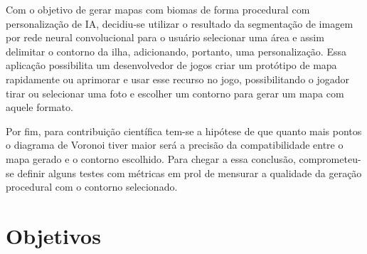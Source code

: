 Com o objetivo de gerar mapas com biomas de forma procedural com personalização de IA, decidiu-se utilizar o resultado da segmentação de imagem por rede neural convolucional para o usuário selecionar uma área e assim delimitar o contorno da ilha, adicionando, portanto, uma personalização. Essa aplicação possibilita um desenvolvedor de jogos criar um protótipo de mapa rapidamente ou aprimorar e usar esse recurso no jogo, possibilitando o jogador tirar ou selecionar uma foto e escolher um contorno para gerar um mapa com aquele formato.

Por fim, para contribuição científica tem-se a hipótese de que quanto mais pontos o diagrama de Voronoi tiver maior será a precisão da compatibilidade entre o mapa gerado e o contorno escolhido. Para chegar a essa conclusão, comprometeu-se definir alguns testes com métricas em prol de mensurar a qualidade da geração procedural com o contorno selecionado.






\section{Objetivos}

